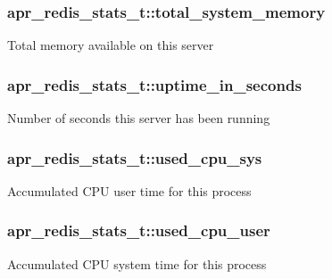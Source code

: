 \subsubsection[{\texorpdfstring{total\+\_\+system\+\_\+memory}{total_system_memory}}]{ apr\+\_\+redis\+\_\+stats\+\_\+t\+::total\+\_\+system\+\_\+memory}\hypertarget{structapr__redis__stats__t_a1db6d6f99e3dbe1d984dfa54e4275ff9}{}\label{structapr__redis__stats__t_a1db6d6f99e3dbe1d984dfa54e4275ff9}
Total memory available on this server 
\subsubsection[{\texorpdfstring{uptime\+\_\+in\+\_\+seconds}{uptime_in_seconds}}]{ apr\+\_\+redis\+\_\+stats\+\_\+t\+::uptime\+\_\+in\+\_\+seconds}\hypertarget{structapr__redis__stats__t_adaf7a5d550e7d879da211be2dd814573}{}\label{structapr__redis__stats__t_adaf7a5d550e7d879da211be2dd814573}
Number of seconds this server has been running 
\subsubsection[{\texorpdfstring{used\+\_\+cpu\+\_\+sys}{used_cpu_sys}}]{ apr\+\_\+redis\+\_\+stats\+\_\+t\+::used\+\_\+cpu\+\_\+sys}\hypertarget{structapr__redis__stats__t_a3c4ef66cbf160fe90938d80c34a145ff}{}\label{structapr__redis__stats__t_a3c4ef66cbf160fe90938d80c34a145ff}
Accumulated C\+PU user time for this process 
\subsubsection[{\texorpdfstring{used\+\_\+cpu\+\_\+user}{used_cpu_user}}]{ apr\+\_\+redis\+\_\+stats\+\_\+t\+::used\+\_\+cpu\+\_\+user}\hypertarget{structapr__redis__stats__t_ac8091b8aadb01f703801bd1e96299c56}{}\label{structapr__redis__stats__t_ac8091b8aadb01f703801bd1e96299c56}
Accumulated C\+PU system time for this process 
